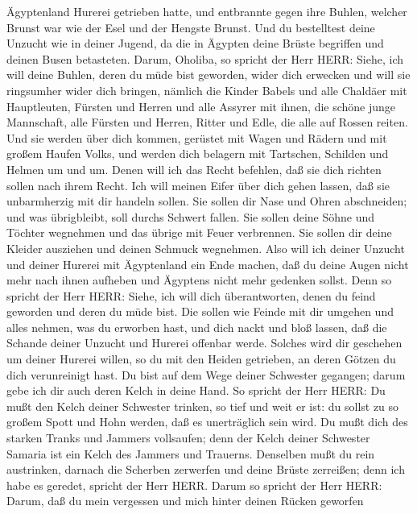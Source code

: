 Ägyptenland Hurerei getrieben hatte,  und entbrannte gegen
ihre Buhlen, welcher Brunst war wie der Esel und der Hengste Brunst.
 Und du bestelltest deine Unzucht wie in deiner Jugend, da
die in Ägypten deine Brüste begriffen und deinen Busen betasteten.
 Darum, Oholiba, so spricht der Herr HERR: Siehe, ich will
deine Buhlen, deren du müde bist geworden, wider dich erwecken und will
sie ringsumher wider dich bringen,  nämlich die Kinder
Babels und alle Chaldäer mit Hauptleuten, Fürsten und Herren und alle
Assyrer mit ihnen, die schöne junge Mannschaft, alle Fürsten und Herren,
Ritter und Edle, die alle auf Rossen reiten.  Und sie
werden über dich kommen, gerüstet mit Wagen und Rädern und mit großem
Haufen Volks, und werden dich belagern mit Tartschen, Schilden und
Helmen um und um. Denen will ich das Recht befehlen, daß sie dich
richten sollen nach ihrem Recht.  Ich will meinen Eifer
über dich gehen lassen, daß sie unbarmherzig mit dir handeln sollen. Sie
sollen dir Nase und Ohren abschneiden; und was übrigbleibt, soll durchs
Schwert fallen. Sie sollen deine Söhne und Töchter wegnehmen und das
übrige mit Feuer verbrennen.  Sie sollen dir deine Kleider
ausziehen und deinen Schmuck wegnehmen.  Also will ich
deiner Unzucht und deiner Hurerei mit Ägyptenland ein Ende machen, daß
du deine Augen nicht mehr nach ihnen aufheben und Ägyptens nicht mehr
gedenken sollst.  Denn so spricht der Herr HERR: Siehe, ich
will dich überantworten, denen du feind geworden und deren du müde bist.
 Die sollen wie Feinde mit dir umgehen und alles nehmen,
was du erworben hast, und dich nackt und bloß lassen, daß die Schande
deiner Unzucht und Hurerei offenbar werde.  Solches wird
dir geschehen um deiner Hurerei willen, so du mit den Heiden getrieben,
an deren Götzen du dich verunreinigt hast.  Du bist auf dem
Wege deiner Schwester gegangen; darum gebe ich dir auch deren Kelch in
deine Hand.  So spricht der Herr HERR: Du mußt den Kelch
deiner Schwester trinken, so tief und weit er ist: du sollst zu so
großem Spott und Hohn werden, daß es unerträglich sein wird.
 Du mußt dich des starken Tranks und Jammers vollsaufen;
denn der Kelch deiner Schwester Samaria ist ein Kelch des Jammers und
Trauerns.  Denselben mußt du rein austrinken, darnach die
Scherben zerwerfen und deine Brüste zerreißen; denn ich habe es geredet,
spricht der Herr HERR.  Darum so spricht der Herr HERR:
Darum, daß du mein vergessen und mich hinter deinen Rücken geworfen
